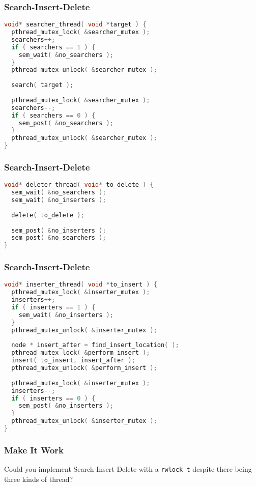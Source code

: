 \begin{frame}[fragile]
	\frametitle{Search-Insert-Delete}
	\begin{lstlisting}[language=C]
void* searcher_thread( void *target ) {
  pthread_mutex_lock( &searcher_mutex );
  searchers++;
  if ( searchers == 1 ) {
    sem_wait( &no_searchers );
  }
  pthread_mutex_unlock( &searcher_mutex );
  
  search( target );
  
  pthread_mutex_lock( &searcher_mutex );
  searchers--;
  if ( searchers == 0 ) {
    sem_post( &no_searchers );
  }
  pthread_mutex_unlock( &searcher_mutex );
}
\end{lstlisting}
\end{frame}

\begin{frame}[fragile]
	\frametitle{Search-Insert-Delete}
	\begin{lstlisting}[language=C]
void* deleter_thread( void* to_delete ) {
  sem_wait( &no_searchers );
  sem_wait( &no_inserters );
  
  delete( to_delete );
  
  sem_post( &no_inserters );
  sem_post( &no_searchers );
}
\end{lstlisting}
\end{frame}

\begin{frame}[fragile]
	\frametitle{Search-Insert-Delete}
	\begin{lstlisting}[language=C]
void* inserter_thread( void *to_insert ) {
  pthread_mutex_lock( &inserter_mutex );
  inserters++;
  if ( inserters == 1 ) {
    sem_wait( &no_inserters );
  }
  pthread_mutex_unlock( &inserter_mutex );
  
  node * insert_after = find_insert_location( );
  pthread_mutex_lock( &perform_insert );
  insert( to_insert, insert_after );
  pthread_mutex_unlock( &perform_insert );
  
  pthread_mutex_lock( &inserter_mutex );
  inserters--;
  if ( inserters == 0 ) {
    sem_post( &no_inserters );
  }
  pthread_mutex_unlock( &inserter_mutex );
}
\end{lstlisting}
\end{frame}

\begin{frame}
\frametitle{Make It Work}

Could you implement Search-Insert-Delete with a \texttt{rwlock\_t} despite there being three kinds of thread?

\end{frame}




